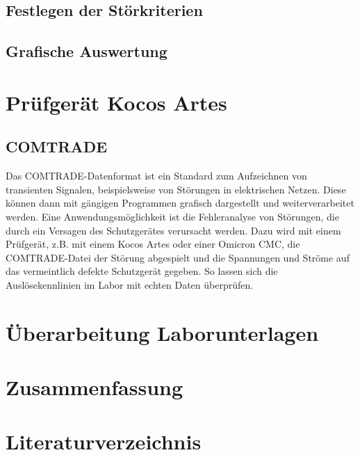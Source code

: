 \documentclass{scrartcl}
\begin{document}
\begin{onehalfspace}
\subsection{Festlegen der Störkriterien}
\subsection{Grafische Auswertung}

\section{Prüfgerät Kocos Artes}
\subsection{COMTRADE}
Das COMTRADE-Datenformat ist ein Standard zum Aufzeichnen von transienten Signalen, beispielsweise von Störungen in elektrischen Netzen. Diese können dann mit gängigen Programmen grafisch dargestellt und weiterverarbeitet werden. Eine Anwendungsmöglichkeit ist die Fehleranalyse von Störungen, die durch ein Versagen des Schutzgerätes verursacht werden. Dazu wird mit einem Prüfgerät, z.B. mit einem Kocos Artes oder einer Omicron CMC, die COMTRADE-Datei der Störung \glqq abgespielt\grqq{} und die Spannungen und Ströme auf das vermeintlich defekte Schutzgerät gegeben. So lassen sich die Auslösekennlinien im Labor mit echten Daten überprüfen.

\section{Überarbeitung Laborunterlagen}
\section{Zusammenfassung}

\newpage
{}
\setcounter{page}{1}
\section{Literaturverzeichnis}





\end{onehalfspace}
\end{document}

